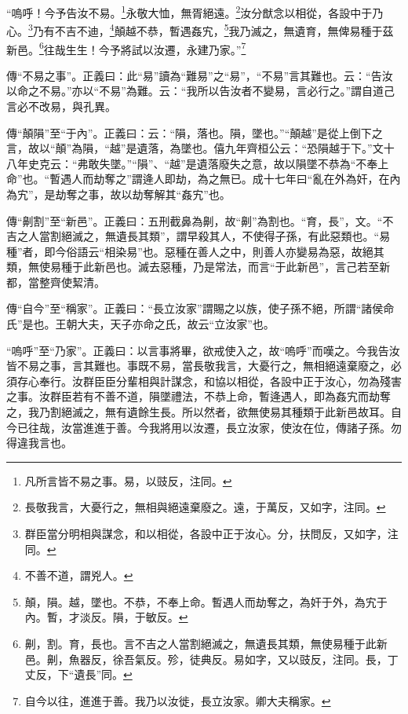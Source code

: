 “嗚呼！今予告汝不易。\footnote{凡所言皆不易之事。易，以豉反，注同。}永敬大恤，無胥絕遠。\footnote{長敬我言，大憂行之，無相與絕遠棄廢之。遠，于萬反，又如字，注同。}汝分猷念以相從，各設中于乃心。\footnote{群臣當分明相與謀念，和以相從，各設中正于汝心。分，扶問反，又如字，注同。}乃有不吉不迪，\footnote{不善不道，謂兇人。}顛越不恭，暫遇姦宄，\footnote{顛，隕。越，墜也。不恭，不奉上命。暫遇人而劫奪之，為奸于外，為宄于內。暫，才淡反。隕，于敏反。}我乃滅之，無遺育，無俾易種于茲新邑。\footnote{劓，割。育，長也。言不吉之人當割絕滅之，無遺長其類，無使易種于此新邑。劓，魚器反，徐吾氣反。殄，徒典反。易如字，又以豉反，注同。長，丁丈反，下“遺長”同。}往哉生生！今予將試以汝遷，永建乃家。”\footnote{自今以往，進進于善。我乃以汝徙，長立汝家。卿大夫稱家。}

{\noindent\zhuan{}\fzbyks 傳“不易之事”。正義曰：此“易”讀為“難易”之“易”，“不易”言其難也。云：“告汝以命之不易。”亦以“不易”為難。云：“我所以告汝者不變易，言必行之。”謂自道己言必不改易，與孔異。 \par}

{\noindent\zhuan{}\fzbyks 傳“顛隕”至“于內”。正義曰：云：“隕，落也。隕，墜也。”“顛越”是從上倒下之言，故以“顛”為隕，“越”是遺落，為墜也。僖九年齊桓公云：“恐隕越于下。”文十八年史克云：“弗敢失墜。”“隕”、“越”是遺落廢失之意，故以隕墜不恭為“不奉上命”也。“暫遇人而劫奪之”謂逄人即劫，為之無已。成十七年曰“亂在外為奸，在內為宄”，是劫奪之事，故以劫奪解其“姦宄”也。 \par}

{\noindent\zhuan{}\fzbyks 傳“劓割”至“新邑”。正義曰：五刑截鼻為劓，故“劓”為割也。“育，長”，文。“不吉之人當割絕滅之，無遺長其類”，謂早殺其人，不使得子孫，有此惡類也。“易種”者，即今俗語云“相染易”也。惡種在善人之中，則善人亦變易為惡，故絕其類，無使易種于此新邑也。滅去惡種，乃是常法，而言“于此新邑”，言己若至新都，當整齊使絜清。 \par}

{\noindent\zhuan{}\fzbyks 傳“自今”至“稱家”。正義曰：“長立汝家”謂賜之以族，使子孫不絕，所謂“諸侯命氏”是也。王朝大夫，天子亦命之氏，故云“立汝家”也。 \par}

{\noindent\shu{}\fzkt “嗚呼”至“乃家”。正義曰：以言事將畢，欲戒使入之，故“嗚呼”而嘆之。今我告汝皆不易之事，言其難也。事既不易，當長敬我言，大憂行之，無相絕遠棄廢之，必須存心奉行。汝群臣臣分輩相與計謀念，和協以相從，各設中正于汝心，勿為殘害之事。汝群臣若有不善不道，隕墜禮法，不恭上命，暫逄遇人，即為姦宄而劫奪之，我乃割絕滅之，無有遺餘生長。所以然者，欲無使易其種類于此新邑故耳。自今已往哉，汝當進進于善。今我將用以汝遷，長立汝家，使汝在位，傳諸子孫。勿得違我言也。 \par}

